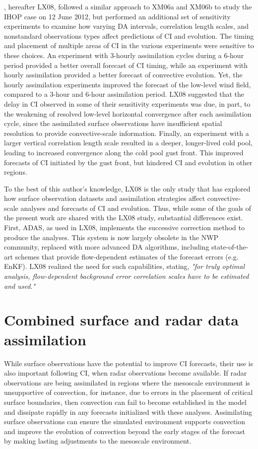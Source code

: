\citet{liuxue08}, hereafter LX08, followed a similar approach to XM06a and XM06b to study the IHOP case on 12 June 2012, but performed an additional set of sensitivity experiments to examine how varying DA intervals, correlation length scales, and nonstandard observations types affect predictions of CI and evolution. The timing and placement of multiple areas of CI in the various experiments were sensitive to these choices. An experiment with 3-hourly assimilation cycles during a 6-hour period provided a better overall forecast of CI timing, while an experiment with hourly assimilation provided a better forecast of convective evolution. Yet, the hourly assimilation experiments improved the forecast of the low-level wind field, compared to a 3-hour and 6-hour assimilation period. LX08 suggested that the delay in CI observed in some of their sensitivity experiments was due, in part, to the weakening of resolved low-level horizontal convergence after each assimilation cycle, since the assimilated surface observations have insufficient spatial resolution to provide convective-scale information. Finally, an experiment with a larger vertical correlation length scale resulted in a deeper, longer-lived cold pool, leading to increased convergence along the cold pool gust front. This improved forecasts of CI initiated by the gust front, but hindered CI and evolution in other regions. 

To the best of this author’s knowledge, LX08 is the only study that has explored how surface observation datasets and assimilation strategies affect convective-scale analyses and forecasts of CI and evolution. Thus, while some of the goals of the present work are shared with the LX08 study, substantial differences exist. First, ADAS, as used in LX08, implements the \citet{bratseth86} successive correction method to produce the analyses. This system is now largely obsolete in the NWP community, replaced with more advanced DA algorithms, including state-of-the-art schemes that provide flow-dependent estimates of the forecast errors (e.g. EnKF). LX08 realized the need for such capabilities, stating, {\it "for truly optimal analysis, flow-dependent background error correlation scales have to be estimated and used."}

\section{Combined surface and radar data assimilation}
While surface observations have the potential to improve CI forecasts, their use is also important following CI, when radar observations become available. If radar observations are being assimilated in regions where the mesoscale environment is unsupportive of convection, for instance, due to errors in the placement of critical surface boundaries, then convection can fail to become established in the model and dissipate rapidly in any forecasts initialized with these analyses. Assimilating surface observations can ensure the simulated environment supports convection and improve the evolution of convection beyond the early stages of the forecast by making lasting adjustments to the mesoscale environment.

